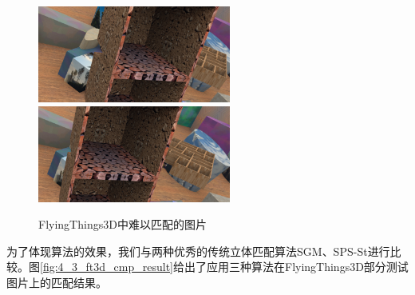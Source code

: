 \begin{figure}[!htbp]
	\centering\includegraphics[width=2.5in]{figures/4_3_abnormal_imgs/l_003}
	\hspace{20pt}
	\centering\includegraphics[width=2.5in]{figures/4_3_abnormal_imgs/r_003}
	\caption{FlyingThings3D中难以匹配的图片}\label{fig:4_3_abnormal}
\end{figure}

为了体现算法的效果，我们与两种优秀的传统立体匹配算法SGM\cite{Hirschmuller08}、SPS-St\cite{yamaguchi2014}进行比较。图\ref{fig:4_3_ft3d_cmp_result}给出了应用三种算法在FlyingThings3D部分测试图片上的匹配结果。


